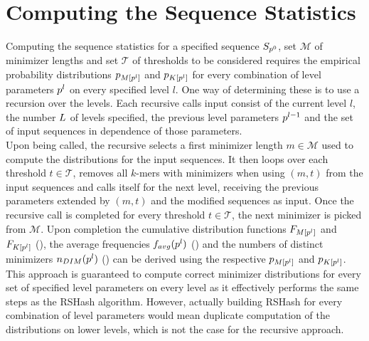 \documentclass[a4paper,titlepage,onecolumn,oneside,12pt,nenglish,titlepage=firstiscover]{scrbook}
\theoremstyle{plain} %
\theoremstyle{definition} %
\theoremstyle{remark} %
\theoremstyle{plain}
\newcommand{\minimizerLength}{m}
\newcommand{\threshold}{t}
\newcommand{\level}{l}
\newcommand{\averageFrequency}{f_{avg}}
\newcommand{\possibleMinimizerLengths}{\mathcal{M}}
\newcommand{\possibleThresholds}{\mathcal{T}}
\begin{document}
\section{Computing the Sequence Statistics} \label{sec:computingSequenceStatistics}
Computing the sequence statistics for a specified sequence $S_{p^{0}}$, set $\possibleMinimizerLengths$ of minimizer lengths and set $\possibleThresholds$ of thresholds to be considered requires the empirical probability distributions $\probabilityDistribution{\compactZV{M}{\levelParameters{\level}}}$ and $\probabilityDistribution{\compactZV{K}{\levelParameters{\level}}}$ for every combination of level parameters $\levelParameters{\level}$ on every specified level $\level$. One way of determining these is to use a recursion over the levels. Each recursive calls input consist of the current level $\level$, the number ${L}$ of levels specified, the previous level parameters $\levelParameters{\level-1}$ and the set of input sequences in dependence of those parameters.\\
Upon being called, the recursive  selects a first minimizer length $\minimizerLength \in \possibleMinimizerLengths$ used to compute the distributions for the input sequences. It then loops over each threshold $\threshold \in \possibleThresholds$, removes all $k$-mers with \infrequent minimizers when using $(\minimizerLength, \threshold)$ from the input sequences and calls itself for the next level, receiving the previous parameters extended by $(\minimizerLength, \threshold)$ and the modified sequences as input.
Once the recursive call is completed for every threshold $\threshold \in \possibleThresholds$, the next minimizer is picked from $\possibleMinimizerLengths$. Upon completion the cumulative distribution functions $\CDF{\compactZV{M}{\levelParameters{\level}}}$ and $\CDF{\compactZV{K}{\levelParameters{\level}}}$ (), the average frequencies $\averageFrequency(\levelParameters{\level})$ () and the numbers of distinct \infrequent minimizers $\numberOfDistinctMinimizers{\levelParameters{\level}}$ () can be derived using the respective $\probabilityDistribution{\compactZV{M}{\levelParameters{\level}}}$ and $\probabilityDistribution{\compactZV{K}{\levelParameters{\level}}}$.\\
This approach is guaranteed to compute correct minimizer distributions for every set of specified level parameters on every level as it effectively performs the same steps as the RSHash algorithm. However, actually building RSHash for every combination of level parameters would mean duplicate computation of the distributions on lower levels, which is not the case for the recursive approach.\\
\end{document}
